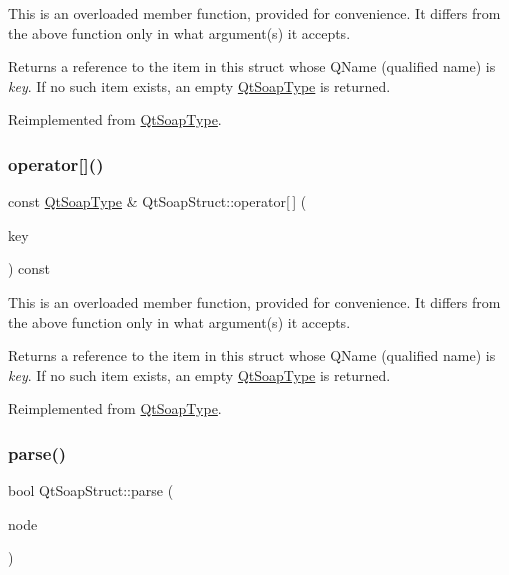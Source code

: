 This is an overloaded member function, provided for convenience. It differs from the above function only in what argument(s) it accepts.

Returns a reference to the item in this struct whose Q\+Name (qualified name) is {\itshape key}. If no such item exists, an empty \mbox{\hyperlink{class_qt_soap_type}{Qt\+Soap\+Type}} is returned. 

Reimplemented from \mbox{\hyperlink{class_qt_soap_type_af77eaf6be2bfbf3635195146a579861b}{Qt\+Soap\+Type}}.

\mbox{\label{class_qt_soap_struct_a914d2ec01b832aa133a4bb159913b072}} 
\subsubsection{\texorpdfstring{operator[]()}{operator[]()}\hspace{0.1cm}{\footnotesize\ttfamily [6/6]}}
{\footnotesize\ttfamily const \mbox{\hyperlink{class_qt_soap_type}{Qt\+Soap\+Type}} \& Qt\+Soap\+Struct\+::operator\mbox{[}$\,$\mbox{]} (\begin{DoxyParamCaption}\item[{const Q\+String \&}]{key }\end{DoxyParamCaption}) const\hspace{0.3cm}{\ttfamily [virtual]}}

This is an overloaded member function, provided for convenience. It differs from the above function only in what argument(s) it accepts.

Returns a reference to the item in this struct whose Q\+Name (qualified name) is {\itshape key}. If no such item exists, an empty \mbox{\hyperlink{class_qt_soap_type}{Qt\+Soap\+Type}} is returned. 

Reimplemented from \mbox{\hyperlink{class_qt_soap_type_a00a0a5b42133b407a302982969d6a168}{Qt\+Soap\+Type}}.

\mbox{\label{class_qt_soap_struct_a995203c62315d9056d78cfe345b6b106}} 
\subsubsection{\texorpdfstring{parse()}{parse()}}
{\footnotesize\ttfamily bool Qt\+Soap\+Struct\+::parse (\begin{DoxyParamCaption}\item[{Q\+Dom\+Node}]{node }\end{DoxyParamCaption})\hspace{0.3cm}{\ttfamily [virtual]}}

